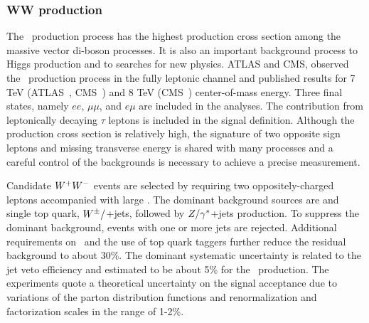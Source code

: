 \subsubsection{WW production}
\label{sss-WWprod}

The \WW\ production process has the highest production cross section
among the massive vector di-boson processes. It is also an important
background process to Higgs production and to searches for new physics.
ATLAS and CMS, observed the \WW\ production process in 
the fully leptonic channel and published results for 7 TeV 
(ATLAS~\cite{ATLAS:2012mec}, CMS~\cite{Chatrchyan:2013yaa}) and
8 TeV (CMS~\cite{Chatrchyan:2013oev}) center-of-mass energy. 
Three final states, namely $ee$, $\mu\mu$, and $e\mu$ are included in the analyses. 
The contribution from leptonically decaying $\tau$ leptons is included in the signal
definition. Although the production cross section is relatively high, the signature of two opposite 
sign leptons and missing transverse energy is shared with many processes and a careful
control of the backgrounds is necessary to achieve a precise measurement.


Candidate $W^+W^-$ events are selected by requiring two oppositely-charged leptons 
accompanied with large \MET. 
The dominant background sources are \ttbar\; and single top quark, 
$W^{\pm}/$+jets, followed by $Z/\gamma^{*}$+jets production.
To suppress the dominant \ttbar\; background, events with one or more jets are rejected.   
Additional requirements on \MET\ and the use of top quark taggers further reduce the residual background
to about 30\%.  
The dominant systematic uncertainty is related to the jet veto efficiency 
and estimated to be about 5\% for the \WW\, production. 
The experiments quote a theoretical uncertainty on the signal acceptance due to 
variations of the parton distribution functions and renormalization and factorization 
scales in the range of 1-2\%.

